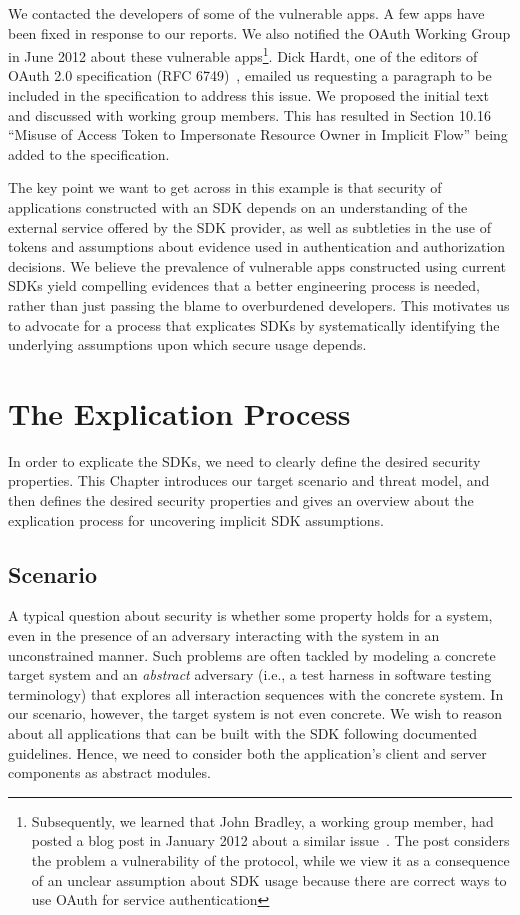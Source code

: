 We contacted the developers of some of the vulnerable apps. A few apps have been fixed in response to our reports.  We also notified the OAuth Working Group in June 2012 about these vulnerable apps\footnote{Subsequently, we learned that John Bradley, a working group member, had posted a blog post in January 2012 about a similar issue~\cite{OAuthVulBlogPost}. The post considers the problem a vulnerability of the protocol, while we view it as a consequence of an unclear assumption about SDK usage because there are correct ways to use OAuth for service authentication}.  Dick Hardt, one of the editors of OAuth 2.0 specification (RFC 6749)~\cite{OAuth2.0}, emailed us requesting a paragraph to be included in the specification to address this issue.  We proposed the initial text and discussed with working group members.  This has resulted in Section 10.16 ``Misuse of Access Token to Impersonate Resource Owner in Implicit Flow'' being added to the specification.

The key point we want to get across in this example is that security of applications constructed with an SDK depends on an understanding of the external service offered by the SDK provider, as well as subtleties in the use of tokens and assumptions about evidence used in authentication and authorization decisions.  We believe the prevalence of vulnerable apps constructed using current SDKs yield compelling evidences that a better engineering process is needed, rather than just passing the blame to overburdened developers.  This motivates us to advocate for a process that explicates SDKs by systematically identifying the underlying assumptions upon which secure usage depends.

\section{The Explication Process}
\label{sec:explicating_explication_process}

In order to explicate the SDKs, we need to clearly define the desired security properties. This Chapter introduces our target scenario and threat model, and then defines the desired security properties and gives an overview about the explication process for uncovering implicit SDK assumptions.

\subsection{Scenario}

A typical question about security is whether some property holds for a system, even in the presence of an adversary interacting with the system in an unconstrained manner.  Such problems are often tackled by modeling a concrete target system and an \emph{abstract} adversary (i.e., a test harness in software testing terminology) that explores all interaction sequences with the concrete system.  In our scenario, however, the target system is not even concrete.  We wish to reason about all applications that can be built with the SDK following documented guidelines.  Hence, we need to consider both the application's client and server components as abstract modules.

